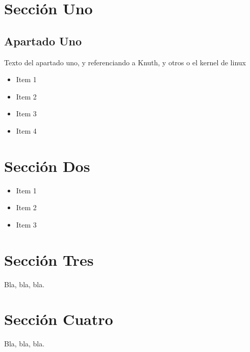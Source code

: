 \section{Sección Uno}
\subsection{Apartado Uno}
\begin{large}
Texto del apartado uno, y referenciando a
	Knuth\cite{knuth97,knuth:1984,texbook}, y
	otros\cite{latex:companion,latex2e,lesk:1977} o el kernel de
	linux\cite{Kernel:GitHub}

\begin{itemize}
   \item Item 1
   \item Item 2
   \item Item 3
   \item Item 4
\end{itemize}
\end{large}

\section{Sección Dos}

\begin{large}
\begin{itemize}
   \item Item 1
   \item Item 2
   \item Item 3
\end{itemize}
\end{large}

\section{Sección Tres}

\begin{large}
Bla, bla, bla.
\end{large}

\section{Sección Cuatro}

\begin{large}
Bla, bla, bla.
\end{large}

\newpage

